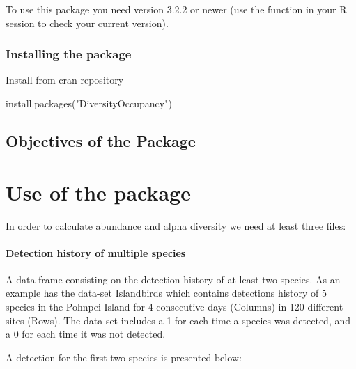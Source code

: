 \documentclass[article]{jss}
\begin{document}
To use this package you need  version 3.2.2 or newer (use
the function  in your R session to check your
current version).

\subsubsection{Installing the package}\label{installing-the-package}

Install from cran repository

\begin{CodeChunk}
\begin{CodeInput}
install.packages("DiversityOccupancy")
\end{CodeInput}
\end{CodeChunk}

\subsection{Objectives of the Package}\label{objectives-of-the-package}

\section{Use of the package}\label{use-of-the-package}

In order to calculate abundance and alpha diversity we need at least
three files:

\paragraph{Detection history of multiple
species}\label{detection-history-of-multiple-species}

A data frame consisting on the detection history of at least two
species. As an example  has the data-set
Islandbirds which contains detections history of 5 species in the
Pohnpei Island for 4 consecutive days (Columns) in 120 different sites
(Rows). The data set includes a 1 for each time a species was detected,
and a 0 for each time it was not detected.

A detection for the first two species is presented below:
\end{document}
